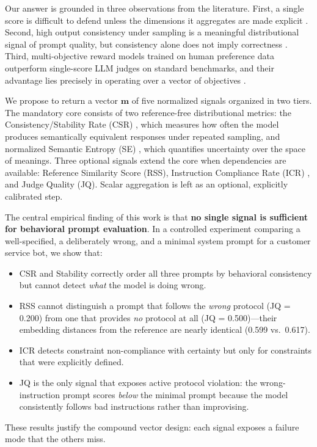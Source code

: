 \documentclass[11pt,a4paper]{article}
\begin{document}
Our answer is grounded in three observations from the literature. First, a single score is difficult to defend unless the dimensions it aggregates are made explicit \citep{unieval2022}. Second, high output consistency under sampling is a meaningful distributional signal of prompt quality, but consistency alone does not imply correctness \citep{selfconsistency2023, glape2024}. Third, multi-objective reward models trained on human preference data outperform single-score LLM judges on standard benchmarks, and their advantage lies precisely in operating over a vector of objectives \citep{armorm2024}.

We propose to return a vector $\mathbf{m}$ of five normalized signals organized in two tiers. The mandatory core consists of two reference-free distributional metrics: the Consistency/Stability Rate (CSR) \citep{selfconsistency2023, glape2024}, which measures how often the model produces semantically equivalent responses under repeated sampling, and normalized Semantic Entropy (SE) \citep{semanticentropy2024}, which quantifies uncertainty over the space of meanings. Three optional signals extend the core when dependencies are available: Reference Similarity Score (RSS), Instruction Compliance Rate (ICR) \citep{ifeval2023}, and Judge Quality (JQ). Scalar aggregation is left as an optional, explicitly calibrated step.

The central empirical finding of this work is that \textbf{no single signal is sufficient for behavioral prompt evaluation}. In a controlled experiment comparing a well-specified, a deliberately wrong, and a minimal system prompt for a customer service bot, we show that:
\begin{itemize}[noitemsep]
    \item CSR and Stability correctly order all three prompts by behavioral consistency but cannot detect \textit{what} the model is doing wrong.
    \item RSS cannot distinguish a prompt that follows the \textit{wrong} protocol (JQ = 0.200) from one that provides \textit{no} protocol at all (JQ = 0.500)---their embedding distances from the reference are nearly identical (0.599 vs.\ 0.617).
    \item ICR detects constraint non-compliance with certainty but only for constraints that were explicitly defined.
    \item JQ is the only signal that exposes active protocol violation: the wrong-instruction prompt scores \textit{below} the minimal prompt because the model consistently follows bad instructions rather than improvising.
\end{itemize}
These results justify the compound vector design: each signal exposes a failure mode that the others miss.
\end{document}

